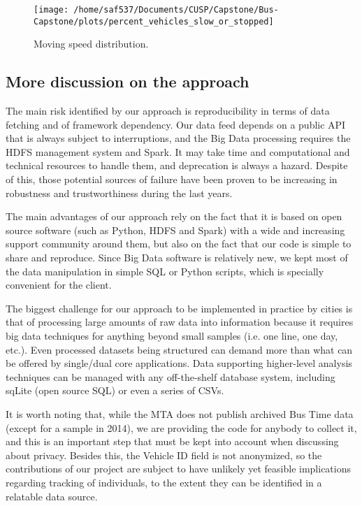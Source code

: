 \documentclass[12pt]{report}
\begin{document}
\begin{itemize}
\begin{figure}[!ht]
  \caption{Moving speed distribution.}
  \label{adh}
  \centering
    \texttt{[image: /home/saf537/Documents/CUSP/Capstone/Bus-Capstone/plots/percent\_vehicles\_slow\_or\_stopped]}
\end{figure}




\end{itemize}


\subsection{More discussion on the approach}

The main risk identified by our approach is reproducibility in terms of data fetching and of framework dependency. Our data feed depends on a public API that is always subject to interruptions, and the Big Data processing requires the HDFS management system and Spark. It may take time and computational and technical resources to handle them, and deprecation is always a hazard. Despite of this, those potential sources of failure have been proven to be increasing in robustness and trustworthiness during the last years.

The main advantages of our approach rely on the fact that it is based on open source software (such as Python, HDFS and Spark) with a wide and increasing support community around them, but also on the fact that our code is simple to share and reproduce. Since Big Data software is relatively new, we kept most of the data manipulation in simple SQL or Python scripts, which is specially convenient for the client.

The biggest challenge for our approach to be implemented in practice by cities is that of processing large amounts of raw data into information because it requires big data techniques for anything beyond small samples (i.e. one line, one day, etc.). Even processed datasets being structured can demand more than what can be offered by single/dual core applications. Data supporting higher-level analysis techniques can be managed with any off-the-shelf database system, including sqLite (open source SQL) or even a series of CSVs.

It is worth noting that, while the MTA does not publish archived Bus Time data (except for a sample in 2014), we are providing the code for anybody to collect it, and this is an important step that must be kept into account when discussing about privacy.  Besides this, the Vehicle ID field is not anonymized, so the contributions of our project are subject to have unlikely yet feasible implications regarding tracking of individuals, to the extent they can be identified in a relatable data source.
\end{document}

